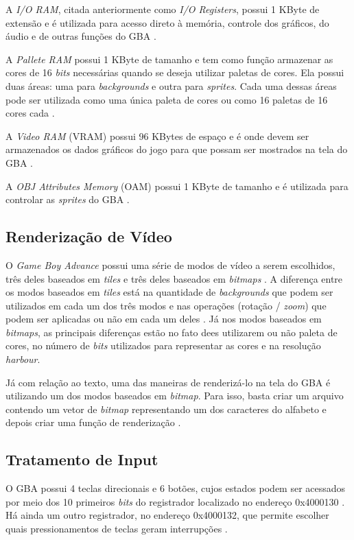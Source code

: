 A \textit{I/O RAM}, citada anteriormente como \textit{I/O Registers}, possui 1 KByte de extensão e é utilizada para acesso direto à memória, controle dos gráficos, do áudio e de outras funções do GBA \cite{cowbite}.

A \textit{Pallete RAM} possui 1 KByte de tamanho e tem como função armazenar as cores de 16 \textit{bits} necessárias quando se deseja utilizar paletas de cores. Ela possui duas áreas: uma para \textit{backgrounds} e outra para \textit{sprites}. Cada uma dessas áreas pode ser utilizada como uma única paleta de cores ou como 16 paletas de 16 cores cada \cite{cowbite}.

A \textit{Video RAM} (VRAM) possui 96 KBytes de espaço e é onde devem ser armazenados os dados gráficos do jogo para que possam ser mostrados na tela do GBA \cite{cowbite}.

A \textit{OBJ Attributes Memory} (OAM) possui 1 KByte de tamanho e é utilizada para controlar as \textit{sprites} do GBA \cite{cowbite}.

\subsection{Renderização de Vídeo}

O \textit{Game Boy Advance} possui uma série de modos de vídeo a serem escolhidos, três deles baseados em \textit{tiles} e três deles baseados em \textit{bitmaps} \cite{harbour}. A diferença entre os modos baseados em \textit{tiles} está na quantidade de \textit{backgrounds} que podem ser utilizados em cada um dos três modos e nas operações (rotação / \textit{zoom}) que podem ser aplicadas ou não em cada um deles \cite{harbour}. Já nos modos baseados em \textit{bitmaps}, as principais diferenças estão no fato dees utilizarem ou não paleta de cores, no número de \textit{bits} utilizados para representar as cores e na resolução \textit{harbour}.

Já com relação ao texto, uma das maneiras de renderizá-lo na tela do GBA é utilizando um dos modos baseados em \textit{bitmap}. Para isso, basta criar um arquivo contendo um vetor de \textit{bitmap} representando um dos caracteres do alfabeto e depois criar uma função de renderização \cite{harbour}.

\subsection{Tratamento de Input}

O GBA possui 4 teclas direcionais e 6 botões, cujos estados podem ser acessados por meio dos 10 primeiros \textit{bits} do registrador localizado no endereço 0x4000130 \cite{gbatek}. Há ainda um outro registrador, no endereço 0x4000132, que permite escolher quais pressionamentos de teclas geram interrupções \cite{cowbite}.

